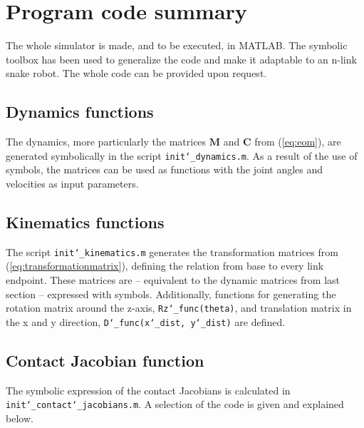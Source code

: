 \section{Program code summary}

The whole simulator is made, and to be executed, in MATLAB. The symbolic toolbox \cite{matlabsymbolic} has been used to generalize the code and make it adaptable to an n-link snake robot. The whole code can be provided upon request.


\subsection{Dynamics functions}

The dynamics, more particularly the matrices $\mathbf{M}$ and $\mathbf{C}$ from (\ref{eq:eom}), are generated symbolically in the script \texttt{init\char`_dynamics.m}.
As a result of the use of symbols, the matrices can be used as functions with the joint angles and velocities as input parameters.


\subsection{Kinematics functions}\label{subseq:kinfunc}

The script \texttt{init\char`_kinematics.m} generates the transformation matrices from (\ref{eq:transformationmatrix}), defining the relation from base to every link endpoint. These matrices are -- equivalent to the dynamic matrices from last section -- expressed with symbols. Additionally, functions for generating the rotation matrix around the z-axis, \texttt{Rz\char`_func(theta)}, and translation matrix in the x and y direction, \texttt{D\char`_func(x\char`_dist, y\char`_dist)} are defined.


\subsection{Contact Jacobian function}\label{subseq:Jcfunc}
The symbolic expression of the contact Jacobians is calculated in \\ \texttt{init\char`_contact\char`_jacobians.m}. A selection of the code is given and explained below.

